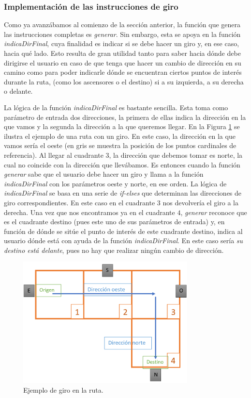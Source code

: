 \subsubsection{Implementación de las instrucciones de giro}
\label{sub:instr_giro}

Como ya avanzábamos al comienzo de la sección anterior, la función que genera las instrucciones completas es \textit{generar}. Sin embargo, esta se apoya en la función \textit{indicaDirFinal}, cuya finalidad es indicar si se debe hacer un giro y, en ese caso, hacia qué lado. Esto resulta de gran utilidad tanto para saber hacia dónde debe dirigirse el usuario en caso de que tenga que hacer un cambio de dirección en su camino como para poder indicarle dónde se encuentran ciertos puntos de interés durante la ruta, (como los ascensores o el destino) si a su izquierda, a su derecha o delante.

La lógica de la función \textit{indicaDirFinal} es bastante sencilla. Esta toma como parámetro de entrada dos direcciones, la primera de ellas indica la dirección en la que vamos y la segunda la dirección a la que queremos llegar. En la Figura \ref{fig:simulacion_giro} se ilustra el ejemplo de una ruta con un giro. En este caso, la dirección en la que vamos sería el oeste (en gris se muestra la posición de los puntos cardinales de referencia). Al llegar al cuadrante $3$, la dirección que debemos tomar es norte, la cual no coincide con la dirección que llevábamos. Es entonces cuando la función \textit{generar} sabe que el usuario debe hacer un giro y llama a la función \textit{indicaDirFinal} con los parámetros oeste y norte, en ese orden. La lógica de \textit{indicaDirFinal} se basa en una serie de \textit{if-elses} que determinan las direcciones de giro correspondientes. En este caso en el cuadrante $3$ nos devolvería el giro a la derecha. Una vez que nos encontramos ya en el cuadrante $4$, \textit{generar} reconoce que es el cuadrante destino (pues este uno de sus parámetros de entrada) y, en función de dónde se sitúe el punto de interés de este cuadrante destino, indica al usuario dónde está con ayuda de la función \textit{indicaDirFinal}. En este caso sería \textit{su destino está delante}, pues no hay que realizar ningún cambio de dirección. 


\begin{figure}[t]
	\centering
	\includegraphics[width=0.8\textwidth]{Imagenes/Capitulo4/simulacion_giro}
	\caption{Ejemplo de giro en la ruta.}
	\label{fig:simulacion_giro}
\end{figure}


